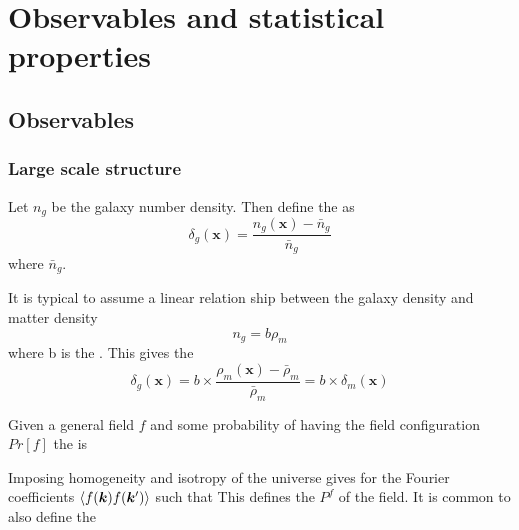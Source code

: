 \documentclass{article}
\begin{document}
\section{Observables and statistical properties}
\subsection{Observables}
\subsubsection*{Large scale structure}
\begin{definition}
Let $n_g$ be the galaxy number density. Then define the  as 
\[
\delta_g(\bm{x}) = \frac{n_g(\bm{x})-\bar{n}_g}{\bar{n}_g}
\]
where $\bar{n}_g$. 
\end{definition}

It is typical to assume a linear relation ship between the galaxy density and matter density 
\[
n_g = b \rho_m
\]
where b is the . This gives the 
\[
\delta_g(\bm{x}) = b \times \frac{\rho_m(\bm{x})-\bar{\rho}_m}{\bar{\rho}_m} = b \times \delta_m(\bm{x})
\]

\begin{definition}
Given a general field $f$ and some probability of having the field configuration $Pr[f]$ the  is 
\end{definition}

\begin{lemma}
Imposing homogeneity and isotropy of the universe gives 
for the Fourier coefficients $\braket{f(\bm{k})f(\bm{k}^\prime)}$ such that 
This defines the  $P^f$ of the field. It is common to also define the  
\end{lemma}
\end{document}
